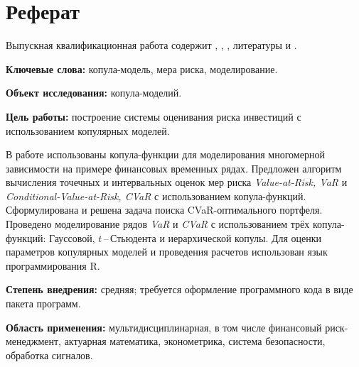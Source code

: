 \section*{Реферат}

Выпускная квалификационная работа содержит , , ,  литературы и .

\textbf{Ключевые слова:} копула-модель, мера риска, моделирование.

\textbf{Объект исследования: }копула-моделий.

\textbf{Цель работы:} построение системы оценивания риска инвестиций с использованием копулярных моделей.

В работе использованы  копула-функции для моделирования многомерной зависимости на примере финансовых временных рядах. 
Предложен алгоритм вычисления точечных и интервальных оценок мер риска \textit{Value-at-Risk, VaR} и \textit{Conditional-Value-at-Risk, CVaR} с использованием копула-функций. 
Сформулирована и решена задача поиска CVaR-оптимального портфеля. 
Проведено моделирование рядов  \textit{VaR} и \textit{CVaR} с использованием трёх копула-функций: Гауссовой, $t$\,--\,Стьюдента и иерархической копулы.
Для оценки параметров копулярных моделей и проведения расчетов  использован язык программирования R. 

\textbf{Степень внедрения:} средняя; требуется оформление программного кода в виде пакета программ.

\textbf{Область применения:} мультидисциплинарная, в том числе финансовый риск-менеджмент, актуарная математика, эконометрика, система безопасности, обработка сигналов.


